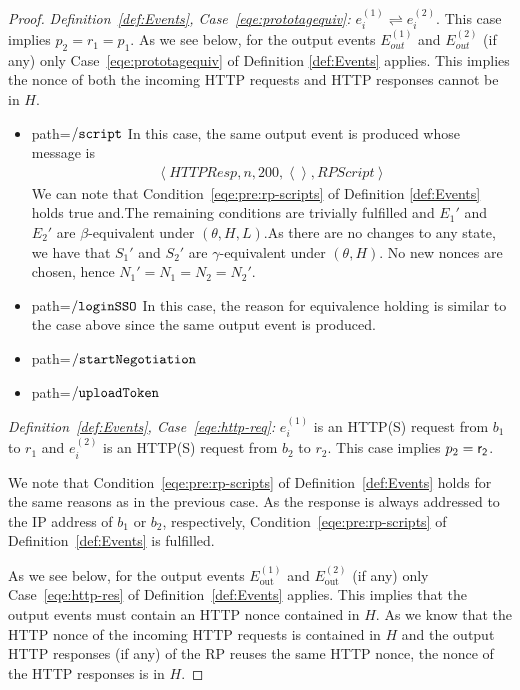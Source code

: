 \documentclass[letterpaper,onecolumn,10pt]{article}
\begin{document}
\begin{proof}
  \noindent \emph{Definition~\ref{def:Events}, Case~\ref{eqe:prototagequiv}:}
  $e_i^{(1)}\rightleftharpoons e_i^{(2)}$. This case implies 
  $p_2=r_1=p_1$. As we see below, for the output events 
  $E_{out}^{(1)}$ and $E_{out}^{(2)}$ (if any) only 
  Case~\ref{eqe:prototagequiv} of Definition \ref{def:Events} 
  applies. This implies the nonce of both the incoming HTTP 
  requests and HTTP responses cannot be in $H$.
  \begin{itemize}
    \item path=$\mathtt{/script}$ In this case, the same output 
    event is produced whose message is 
    \begin{equation}
      \begin{aligned}
        \left\langle HTTPResp,n,200,\left\langle\right\rangle,RPScript\right\rangle
      \end{aligned}
    \end{equation}
    We can note that Condition~\ref{eqe:pre:rp-scripts} of 
    Definition \ref{def:Events} 
    holds true and.The remaining conditions are trivially 
    fulfilled and $E_1\prime$ and $E_2\prime$ are 
    $\beta$-equivalent under $(\theta,H,L)$.As there are no 
    changes to any state, we have that $S_1\prime$ and 
    $S_2\prime$ are $\gamma$-equivalent under $(\theta,H)$. 
    No new nonces are chosen, hence $N_1\prime=N_1=N_2=N_2\prime$.
    \item path=$\mathtt{/loginSSO}$ In this case, the reason for 
    equivalence holding is similar to the case above since the 
    same output event is produced.
    \item path=$\mathtt{/startNegotiation}$
    \item path=$\mathtt{/uploadToken}$
  \end{itemize}

  \noindent \emph{Definition~\ref{def:Events}, Case~\ref{eqe:http-req}:} 
  $e_i^{(1)}$ is an HTTP(S) request from $b_1$ to $r_1$ and 
  $e_i^{(2)}$ is an HTTP(S) request from $b_2$ to $r_2$. 
  This case implies $p_2 = \mathsf{r_2}$.

  We note that Condition~\ref{eqe:pre:rp-scripts} of 
  Definition~\ref{def:Events} holds for the same reasons as in
  the previous case. As the response is always addressed to 
  the IP address of $b_1$ or $b_2$, respectively,
  Condition~\ref{eqe:pre:rp-scripts} of
  Definition~\ref{def:Events} is fulfilled. 

  As we see below, for the output events $E^{(1)}_\text{out}$ 
  and $E^{(2)}_\text{out}$ (if any) only Case~\ref{eqe:http-res} 
  of Definition~\ref{def:Events} applies. This implies that the
  output events must contain an HTTP nonce contained in $H$. As 
  we know that the HTTP nonce of the incoming HTTP requests is 
  contained in $H$ and the output HTTP responses (if any) of the 
  RP reuses the same HTTP nonce, the nonce of the HTTP responses 
  is in $H$.


\end{proof}
\end{document}
